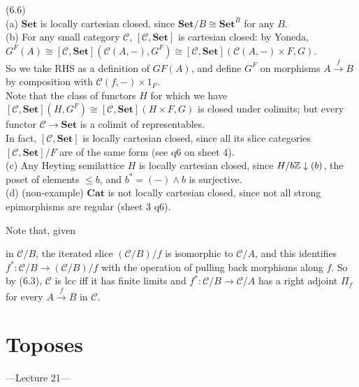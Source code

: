 \documentclass[a4paper]{article}
\begin{document}
\begin{eg} (6.6)\\
	(a) $\mathbf{Set}$ is locally cartesian closed, since $\mathbf{Set}/B \cong \mathbf{Set}^B$ for any $B$.\\
	(b) For any small category $\mathcal{C}$, $[\mathcal{C},\mathbf{Set}]$ is cartesian closed: by Yoneda, $G^F(A) \cong [\mathcal{C},\mathbf{Set}](\mathcal{C}(A,-),G^F) \cong  [\mathcal{C},\mathbf{Set}](\mathcal{C}(A,-) \times F,G)$.\\
	So we take RHS as a definition of $GF(A)$, and define $G^F$ on morphisms $A \xrightarrow{f} B$ by composition with $\mathcal{C}(f,-) \times 1_F$.\\
	Note that the class of functors $H$ for which we have $[\mathcal{C},\mathbf{Set}](H,G^F) \cong [\mathcal{C},\mathbf{Set}](H \times F,G)$ is closed under colimits; but every functor $\mathcal{C} \to \mathbf{Set}$ is a colimit of representables.\\
	In fact, $[\mathcal{C},\mathbf{Set}]$ is locally cartesian closed, since all its slice categories $[\mathcal{C},\mathbf{Set}]/F$ are of the same form (see q6 on sheet 4).\\
	(c) Any Heyting semilattice $H$ is locally cartesian closed, since $H/b\mathbb{Z} \downarrow (b)$, the poset of elements $\leq b$, and $b^* = (-) \wedge b$ is surjective.\\
	(d) (non-example) $\mathbf{Cat}$ is not locally cartesian closed, since not all strong epimorphisms are regular (sheet 3 q6).\\
\end{eg}

Note that, given 
in $\mathcal{C}/B$, the iterated slice $(\mathcal{C}/B)/f$ is isomorphic to $\mathcal{C}/A$, and this identifies $f^*:\mathcal{C}/B \to (\mathcal{C}/B)/f$ with the operation of pulling back morphisms along $f$. So by (6.3), $\mathcal{C}$ is lcc iff it has finite limits and $f^*:\mathcal{C}/B \to \mathcal{C}/A$ has a right adjoint $\Pi_f$ for every $A \xrightarrow{f} B$ in $\mathcal{C}$.


\newpage

\section{Toposes}

---Lecture 21---
\end{document}
